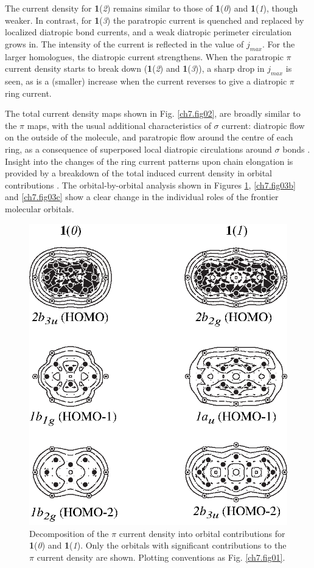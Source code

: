 The current density for \textbf{1}(\textit{2}) remains similar to those of \textbf{1}(\textit{0}) and \textbf{1}(\textit{1}), though weaker. In contrast, for \textbf{1}(\textit{3}) the paratropic current is quenched and replaced by localized diatropic bond currents, and a weak diatropic perimeter circulation grows in. The intensity of the current is reflected in the value of $j_{max}$. For the larger homologues, the diatropic current strengthens. When the paratropic $\pi$ current density starts to break down (\textbf{1}(\textit{2}) and \textbf{1}(\textit{3})), a sharp drop in $j_{max}$ is seen, as is a (smaller) increase when the current reverses to give a diatropic $\pi$ ring current.

The total current density maps shown in Fig. \ref{ch7.fig02}, are broadly similar to the $\pi$ maps, with the usual additional characteristics of $\sigma$ current: diatropic flow on the outside of the molecule, and paratropic flow around the centre of each ring, as a consequence of superposed local diatropic circulations around $\sigma$ bonds \cite{r18}. Insight into the changes of the ring current patterns upon chain elongation is provided by a breakdown of the total induced current density in orbital contributions  \cite{r35,r36}.
\clearpage
\newpage
The orbital-by-orbital analysis shown in Figures \ref{ch7.fig03a}, \ref{ch7.fig03b} and \ref{ch7.fig03c}  show a clear change in the individual roles of the frontier molecular orbitals.
\begin{figure}[htp]
\center
\includegraphics{indacene/figures/figure3a.eps}
\caption{Decomposition of the $\pi$ current density into orbital contributions for \textbf{1}(\textit{0}) and \textbf{1}(\textit{1}). Only the orbitals with significant contributions to the $\pi$ current density are shown. Plotting conventions as Fig. \ref{ch7.fig01}.}
\label{ch7.fig03a}
\end{figure}
